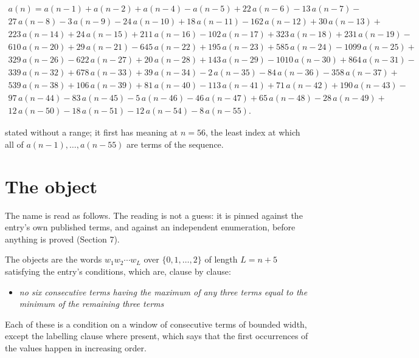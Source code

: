\documentclass[11pt]{article}
\theoremstyle{definition}
\begin{document}
\begin{multline*} a(n) = a(n-1) + a(n-2) + a(n-4) - a(n-5) + 22\,a(n-6) - 13\,a(n-7) - \\ 27\,a(n-8) - 3\,a(n-9) - 24\,a(n-10) + 18\,a(n-11) - 162\,a(n-12) + 30\,a(n-13) + \\ 223\,a(n-14) + 24\,a(n-15) + 211\,a(n-16) - 102\,a(n-17) + 323\,a(n-18) + 231\,a(n-19) - \\ 610\,a(n-20) + 29\,a(n-21) - 645\,a(n-22) + 195\,a(n-23) + 585\,a(n-24) - 1099\,a(n-25) + \\ 329\,a(n-26) - 622\,a(n-27) + 20\,a(n-28) + 143\,a(n-29) - 1010\,a(n-30) + 864\,a(n-31) - \\ 339\,a(n-32) + 678\,a(n-33) + 39\,a(n-34) - 2\,a(n-35) - 84\,a(n-36) - 358\,a(n-37) + \\ 539\,a(n-38) + 106\,a(n-39) + 81\,a(n-40) - 113\,a(n-41) + 71\,a(n-42) + 190\,a(n-43) - \\ 97\,a(n-44) - 83\,a(n-45) - 5\,a(n-46) - 46\,a(n-47) + 65\,a(n-48) - 28\,a(n-49) + \\ 12\,a(n-50) - 18\,a(n-51) - 12\,a(n-54) - 8\,a(n-55). \end{multline*}

stated without a range; it first has meaning at $n = 56$, the least index at which all of $a(n-1),\dots,a(n-55)$ are terms of the sequence.

\section{The object}

The name is read as follows. The reading is not a guess: it is pinned against the entry's own published terms, and against an independent enumeration, before anything is proved (Section 7).

The objects are the words $w_1 w_2 \cdots w_L$ over $\{0,1,\dots,2\}$ of length $L = n + 5$ satisfying the entry's conditions, which are, clause by clause:

\begin{itemize}

\item {\itshape no six consecutive terms having the maximum of any three terms equal to the minimum of the remaining three terms}

\end{itemize}

Each of these is a condition on a window of consecutive terms of bounded width, except the labelling clause where present, which says that the first occurrences of the values happen in increasing order.
\end{document}
